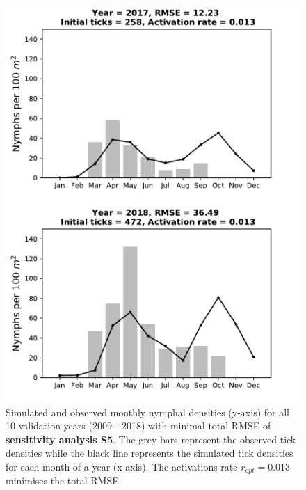 \documentclass[a4paper, 11pt]{scrartcl}
\begin{document}
\begin{figure}[h!]
\begin{minipage}[c]{0.40\linewidth}
\end{minipage}
\begin{minipage}[c]{0.40\linewidth}
\includegraphics[width=\linewidth]{figures/s5/S5_2017}
\end{minipage}
\begin{minipage}[c]{0.40\linewidth}
\includegraphics[width=\linewidth]{figures/s5/S5_2018}
\end{minipage}
\caption{Simulated and observed monthly nymphal densities (y-axis) for all 10 validation years (2009 - 2018) with minimal total RMSE of \textbf{sensitivity analysis S5}. The grey bars represent the observed tick densities while the black line represents the simulated tick densities for each month of a year (x-axis). The activations rate $r_{opt}= 0.013$ minimises the total RMSE.}
\label{fig:1nymphs_4larvae}
\end{figure}
\end{document}

